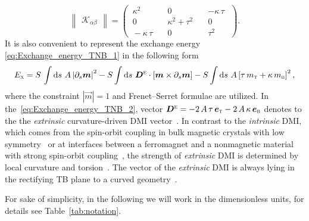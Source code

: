 \begin{equation} \label{eq:K_tensor_exchange}
\begin{Vmatrix} \mathcal{K}_{\alpha \beta} \end{Vmatrix} = \left(\begin{matrix*}  \, \kappa^2 \quad	& 0 \quad & - \kappa \, \tau \, \,  \\
\, 0 \quad & \kappa^2 + \tau^2 \quad & 0 \, \,  \\
\, - \kappa \, \tau \quad & 0 \quad &	\tau^2 \, \, 
\end{matrix*}\right).
\end{equation}
It is also convenient to represent the exchange energy \eqref{eq:Exchange_energy_TNB_1} in the following form
\begin{equation} \label{eq:Exchange_energy_TNB_2}
E_{\textsc{x}} =  S \, \int \textrm{d} s \, \, A \left| \partial_s \vec{m} \right|^2 - S \int \textrm{d} s \, \, \vec{D}^{\scriptsize \textsc{e}} \cdot [\vec{m} \times \partial_s\vec{m}] - S \int \textrm{d} s \, \, A \left[ \tau \, m_{\scriptsize \textsc{t}}  + \kappa \, m_{\scriptsize \textsc{b}} \right]^2, 
\end{equation}
where the constraint $|\vec{m}|=1$ and Frenet--Serret formulae are utilized. In the~\eqref{eq:Exchange_energy_TNB_2}, vector $\vec{D}^{\scriptsize \textsc{e}} = - 2 \, A \, \tau \, \vec{e}_{\scriptsize \textsc{t}} - 2 \, A \, \kappa \, \vec{e}_{\scriptsize \textsc{b}}$ denotes to the the \textit{extrinsic} curvature-driven DMI vector~\cite{Gaididei14,Sheka15,Sheka15c}.	In contrast to the \textit{intrinsic} DMI, which comes from the spin-orbit coupling in bulk magnetic crystals with low symmetry~\cite{Dzyaloshinsky58,Moriya60a} or at interfaces between a ferromagnet and a nonmagnetic material with strong spin-orbit coupling~\cite{Fert90,Crepieux98,Bode07,Yang15}, the strength of \textit{extrinsic} DMI is determined by local curvature and torsion~\cite{Pylypovskyi16,Volkov19c}. The vector of the \textit{extrinsic} DMI is always lying in the rectifying TB plane to a curved geometry~\cite{Volkov18}.

For sake of simplicity, in the following we will work in the dimensionless units, for details see Table~\ref{tab:notation}.

